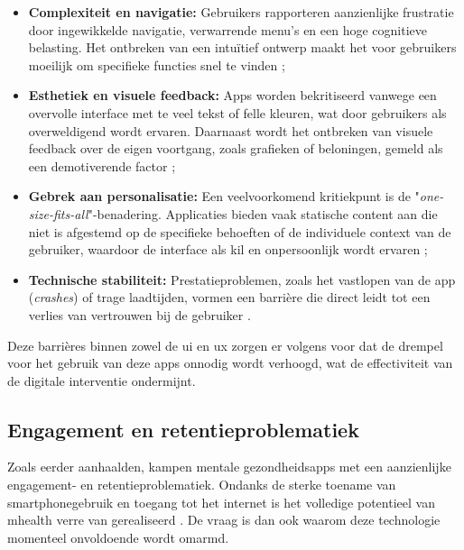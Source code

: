 \begin{itemize}
    \item \textbf{Complexiteit en navigatie:} Gebruikers rapporteren aanzienlijke frustratie door ingewikkelde navigatie, verwarrende menu's en een hoge cognitieve belasting. Het ontbreken van een intuïtief ontwerp maakt het voor gebruikers moeilijk om specifieke functies snel te vinden \autocite{Alqahtani2020};
    \item \textbf{Esthetiek en visuele feedback:} Apps worden bekritiseerd vanwege een overvolle interface met te veel tekst of felle kleuren, wat door gebruikers als overweldigend wordt ervaren. Daarnaast wordt het ontbreken van visuele feedback over de eigen voortgang, zoals grafieken of beloningen, gemeld als een demotiverende factor \autocite{Alqahtani2020};
    \item \textbf{Gebrek aan personalisatie:} Een veelvoorkomend kritiekpunt is de "\textit{one-size-fits-all}"-benadering. Applicaties bieden vaak statische content aan die niet is afgestemd op de specifieke behoeften of de individuele context van de gebruiker, waardoor de interface als kil en onpersoonlijk wordt ervaren \autocite{Alqahtani2020};
    \item \textbf{Technische stabiliteit:} Prestatieproblemen, zoals het vastlopen van de app (\textit{crashes}) of trage laadtijden, vormen een barrière die direct leidt tot een verlies van vertrouwen bij de gebruiker \autocite{Alqahtani2020}.
\end{itemize}

\vspace{1em}

Deze barrières binnen zowel de \acrshort{ui} en \acrshort{ux} zorgen er volgens \textcite{Alqahtani2020} voor dat de drempel voor het gebruik van deze apps onnodig wordt verhoogd, wat de effectiviteit van de digitale interventie ondermijnt.

\vspace{1em}

\subsection{Engagement en retentieproblematiek}
\label{subsec:engagement-retentie}

\vspace{1em}

Zoals \textcite{Koh2022} eerder aanhaalden, kampen mentale gezondheidsapps met een aanzienlijke engagement- en retentieproblematiek. Ondanks de sterke toename van smartphonegebruik en toegang tot het internet is het volledige potentieel van \acrshort{mhealth} verre van gerealiseerd \autocite{Portz2024}. De vraag is dan ook waarom deze technologie momenteel onvoldoende wordt omarmd. 

